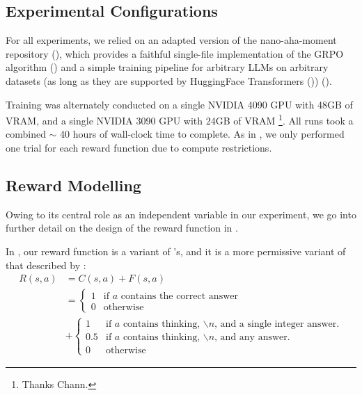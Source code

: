 \documentclass{article} %
\theoremstyle{definition}
\begin{document}
\subsection{Experimental Configurations}

For all experiments, we relied on an adapted version of the nano-aha-moment repository (\cite{nano-aha-moment}),
which provides a faithful single-file implementation of the GRPO algorithm (\cite{grpo})
and a simple training pipeline for arbitrary LLMs on arbitrary datasets (as long
as they are supported by HuggingFace Transformers (\cite{hf-transformers})) (\cite{wk10}).

Training was alternately conducted on a single NVIDIA 4090 GPU with 48GB of VRAM,
and a single NVIDIA 3090 GPU with 24GB of VRAM \footnote{
    Thanks Chann.
}. All runs took a combined $\sim$ 40 hours of wall-clock time to complete.
As in \cite{wk10}, we only performed one trial for each reward function 
due to compute restrictions.

\subsection{Reward Modelling}

Owing to its central role as an independent variable in our experiment,
we go into further detail on the design of the reward function in \cite{wk10}.

In \cite{wk10}, our reward function is a variant of \cite{nano-aha-moment}'s, 
and it is a more permissive variant of that
described by \cite{r1}:
\begin{equation} \label{eq:control-reward-fn}
    \begin{array}{rl}
        R(s, a) &= C(s, a) + F(s, a) \\
        & =\begin{cases}
            1 & \text{if } a \text{ contains the correct answer} \\
            0 & \text{otherwise}
        \end{cases} \\
        & + \begin{cases}
            1 & \text{if } a \text{ contains thinking, $\backslash n$, and a single integer answer.} \\
            0.5 & \text{if } a \text{ contains thinking, $\backslash n$, and any answer.} \\
            0 & \text{otherwise}
        \end{cases}
    \end{array}
\end{equation}
\end{document}
